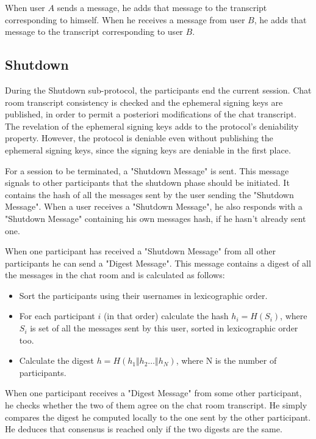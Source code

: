 When user $A$ sends a message, he adds that message to the transcript corresponding to himself.
When he receives a message from user $B$, he adds that message to the transcript corresponding to user $B$.

\subsection{Shutdown}
\label{subsections:shutdown}
During the Shutdown sub-protocol, the participants end the current session. Chat room transcript consistency is checked and the ephemeral signing keys are published, in order to permit a posteriori modifications of the chat transcript. The revelation of the ephemeral signing keys adds to the protocol's deniability property. However, the protocol is deniable even without publishing the ephemeral signing keys, since the signing keys are deniable in the first place.

For a session to be terminated, a "Shutdown Message" is sent. This message signals to other participants that the shutdown phase should be initiated. It contains the  hash of all the messages sent by the user sending the "Shutdown Message". When a user receives a "Shutdown Message", he also responds with a "Shutdown Message" containing his own messages hash, if he hasn't already sent one.

When one participant has received a "Shutdown Message" from all other participants he can send a "Digest Message". This message contains a digest of all the messages in the chat room and is calculated as follows:
\begin{itemize}
  \item[] Sort the participants using their usernames in lexicographic order.
  \item[] For each participant $i$ (in that order) calculate the hash $h_i = H(S_i)$, where $S_i$ is set of all the messages sent by this user, sorted in lexicographic order too.
  \item[] Calculate the digest $h = H(h_1 \Vert h_2 \dots \Vert h_N)$, where N is the number of participants.
\end{itemize}

When one participant receives a "Digest Message" from some other participant, he checks whether the two of them agree on the chat room transcript. He simply compares the digest he computed locally to the one sent by the other participant. He deduces that consensus is reached only if the two digests are the same.

